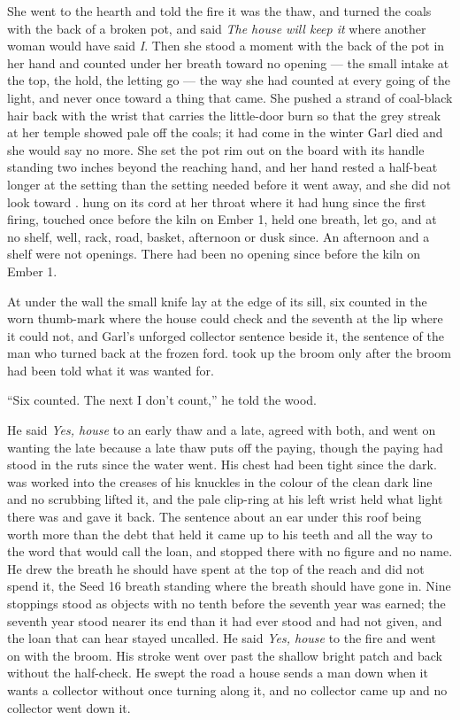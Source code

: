 She went to the hearth and told the fire it was the thaw, and turned the coals with the back of a broken pot, and said \emph{The house will keep it} where another woman would have said \emph{I}. Then she stood a moment with the back of the pot in her hand and counted under her breath toward no opening --- the small intake at the top, the hold, the letting go --- the way she had counted at every going of the light, and never once toward a thing that came. She pushed a strand of coal-black hair back with the wrist that carries the little-door burn so that the grey streak at her temple showed pale off the coals; it had come in the winter Garl died and she would say no more. She set the pot rim out on the board with its handle standing two inches beyond the reaching hand, and her hand rested a half-beat longer at the setting than the setting needed before it went away, and she did not look toward .  hung on its cord at her throat where it had hung since the first firing, touched once before the kiln on Ember 1, held one breath, let go, and at no shelf, well, rack, road, basket, afternoon or dusk since. An afternoon and a shelf were not openings. There had been no opening since before the kiln on Ember 1.

\scenebreak

At  under the wall the small knife lay at the edge of its sill, six counted in the worn thumb-mark where the house could check and the seventh at the lip where it could not, and Garl's unforged collector sentence beside it, the sentence of the man who turned back at the frozen ford.  took up the broom only after the broom had been told what it was wanted for.

“Six counted. The next I don't count,” he told the wood.

He said \emph{Yes, house} to an early thaw and a late, agreed with both, and went on wanting the late because a late thaw puts off the paying, though the paying had stood in the ruts since the water went. His chest had been tight since the dark.  was worked into the creases of his knuckles in the colour of the clean dark line and no scrubbing lifted it, and the pale clip-ring at his left wrist held what light there was and gave it back. The sentence about an ear under this roof being worth more than the debt that held it came up to his teeth and all the way to the word that would call the loan, and stopped there with no figure and no name. He drew the breath he should have spent at the top of the reach and did not spend it, the Seed 16 breath standing where the breath should have gone in. Nine stoppings stood as objects with no tenth before the seventh year was earned; the seventh year stood nearer its end than it had ever stood and had not given, and the loan that can hear stayed uncalled. He said \emph{Yes, house} to the fire and went on with the broom. His stroke went over  past the shallow bright patch and back without the half-check. He swept the road a house sends a man down when it wants a collector without once turning along it, and no collector came up  and no collector went down it.

